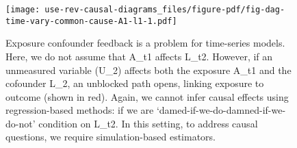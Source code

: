 \documentclass[
  singlecolumn,
  9pt]{article}
\begin{document}
\begin{figure}

{\centering \texttt{[image: use-rev-causal-diagrams\_files/figure-pdf/fig-dag-time-vary-common-cause-A1-l1-1.pdf]}

}

\caption{\label{fig-dag-time-vary-common-cause-A1-l1}Exposure confounder
feedback is a problem for time-series models. Here, we do not assume
that A\_t1 affects L\_t2. However, if an unmeasured variable (U\_2)
affects both the exposure A\_t1 and the cofounder L\_2, an unblocked
path opens, linking exposure to outcome (shown in red). Again, we cannot
infer causal effects using regression-based methods: if we are
`damed-if-we-do-damned-if-we-do-not' condition on L\_t2. In this
setting, to address causal questions, we require simulation-based
estimators.}

\end{figure}
\end{document}
